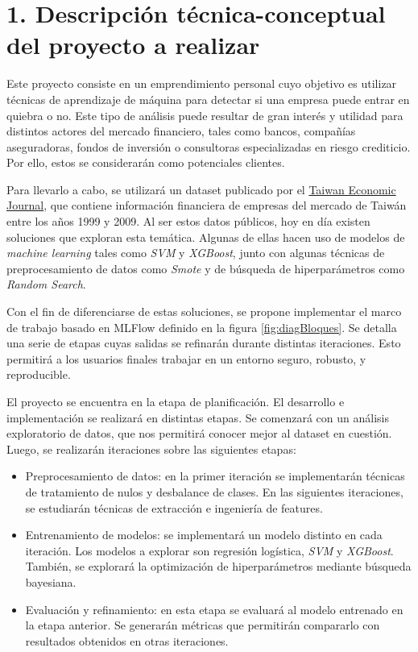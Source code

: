 \documentclass[
11pt, %
]{charter}
\begin{document}
\section{1. Descripción técnica-conceptual del proyecto a realizar}
\label{sec:descripcion}

Este proyecto consiste en un emprendimiento personal cuyo objetivo es utilizar técnicas de aprendizaje de máquina para detectar si una empresa puede entrar en quiebra o no. Este tipo de análisis puede resultar de gran interés y utilidad para distintos actores del mercado financiero, tales como bancos, compañías aseguradoras, fondos de inversión o consultoras especializadas en riesgo crediticio. Por ello, estos se considerarán como potenciales clientes.

Para llevarlo a cabo, se utilizará un dataset publicado por el \href{https://www.tejwin.com/en/}{Taiwan Economic Journal}, que contiene información financiera de empresas del mercado de Taiwán entre los años 1999 y 2009. Al ser estos datos públicos, hoy en día existen soluciones que exploran esta temática. Algunas de ellas hacen uso de modelos de \textit{machine learning} tales como \textit{SVM} y \textit{XGBoost}, junto con algunas técnicas de preprocesamiento de datos como \textit{Smote} y de búsqueda de hiperparámetros como \textit{Random Search}.

Con el fin de diferenciarse de estas soluciones, se propone implementar el marco de trabajo basado en MLFlow definido en la figura \ref{fig:diagBloques}. Se detalla una serie de etapas cuyas salidas se refinarán durante distintas iteraciones. Esto permitirá a los usuarios finales trabajar en un entorno seguro, robusto, y reproducible.

El proyecto se encuentra en la etapa de planificación. El desarrollo e implementación se realizará en distintas etapas. Se comenzará con un análisis exploratorio de datos, que nos permitirá conocer mejor al dataset en cuestión. Luego, se realizarán iteraciones sobre las siguientes etapas:

\begin{itemize}
	\item Preprocesamiento de datos: en la primer iteración se implementarán técnicas de tratamiento de nulos y desbalance de clases. En las siguientes iteraciones, se estudiarán técnicas de extracción e ingeniería de features.
	\item Entrenamiento de modelos: se implementará un modelo distinto en cada iteración. Los modelos a explorar son regresión logística, \textit{SVM} y \textit{XGBoost}. También, se explorará la optimización de hiperparámetros mediante búsqueda bayesiana.
	\item Evaluación y refinamiento: en esta etapa se evaluará al modelo entrenado en la etapa anterior. Se generarán métricas que permitirán compararlo con resultados obtenidos en otras iteraciones.
\end{itemize}
\end{document}
